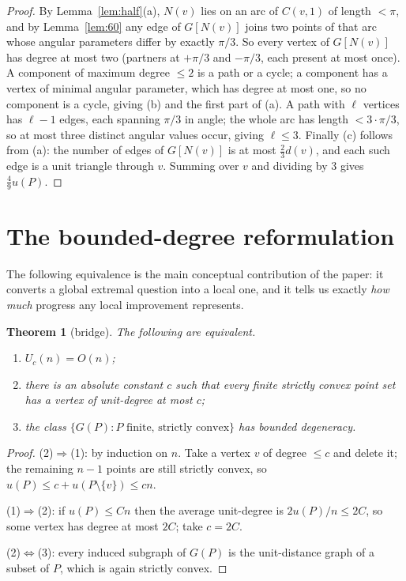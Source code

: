 \documentclass[11pt]{article}
\newtheorem{theorem}{Theorem}
\theoremstyle{definition}
\theoremstyle{remark}
\newcommand{\UC}{U_c}
\begin{document}
\begin{proof}
By Lemma~\ref{lem:half}(a), $N(v)$ lies on an arc of $C(v,1)$ of length $<\pi$, and
by Lemma~\ref{lem:60} any edge of $G[N(v)]$ joins two points of that arc whose angular
parameters differ by exactly $\pi/3$.  So every vertex of $G[N(v)]$ has degree at most
two (partners at $+\pi/3$ and $-\pi/3$, each present at most once).  A component of
maximum degree $\le2$ is a path or a cycle; a component has a vertex of minimal angular
parameter, which has degree at most one, so no component is a cycle, giving (b) and the
first part of (a).  A path with $\ell$ vertices has $\ell-1$ edges, each spanning
$\pi/3$ in angle; the whole arc has length $<3\cdot\pi/3$, so at most three distinct
angular values occur, giving $\ell\le3$.  Finally (c) follows from (a): the number of
edges of $G[N(v)]$ is at most $\tfrac23 d(v)$, and each such edge is a unit triangle
through $v$.  Summing over $v$ and dividing by $3$ gives $\tfrac49 u(P)$.
\end{proof}

\section{The bounded-degree reformulation}

The following equivalence is the main conceptual contribution of the paper: it converts
a global extremal question into a local one, and it tells us exactly \emph{how much}
progress any local improvement represents.

\begin{theorem}[bridge]\label{thm:bridge}
The following are equivalent.
\begin{enumerate}[label=\textup{(\arabic*)}]
\item $\UC(n)=O(n)$;
\item there is an absolute constant $c$ such that every finite strictly convex point
set has a vertex of unit-degree at most $c$;
\item the class $\{G(P): P\text{ finite, strictly convex}\}$ has bounded degeneracy.
\end{enumerate}
\end{theorem}

\begin{proof}
(2)$\Rightarrow$(1): by induction on $n$.  Take a vertex $v$ of degree $\le c$ and
delete it; the remaining $n-1$ points are still strictly convex, so
$u(P)\le c+u(P\setminus\{v\})\le cn$.

(1)$\Rightarrow$(2): if $u(P)\le Cn$ then the average unit-degree is
$2u(P)/n\le 2C$, so some vertex has degree at most $2C$; take $c=2C$.

(2)$\Leftrightarrow$(3): every induced subgraph of $G(P)$ is the unit-distance graph of
a subset of $P$, which is again strictly convex.
\end{proof}
\end{document}
